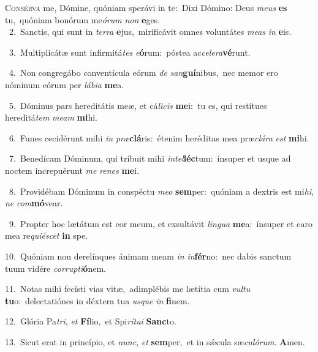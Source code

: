 \lettrine{\initial\textcolor{\initialcolor}{C}}{onsérva} me, Dómine, quóniam sperávi in te:~\dagger Dixi Dómino: Deus \textit{me}\-\textit{us} \textbf{es} tu,~\star quóniam bonórum me\-\textit{ó}\-\textit{rum} \textit{non} \textbf{e}\-ges.\\
{\numbfont\textcolor{\numbcolor}{~2.}}~Sanctis, qui sunt in \textit{ter}\-\textit{ra} \textbf{e}\-jus,~\star mirificávit omnes voluntátes \textit{me}\-\textit{as} \textit{in} \textbf{e}\-is.\par
{\numbfont\textcolor{\numbcolor}{~3.}}~Multiplicátæ sunt infirmitá\textit{tes} \textit{e}\-\textbf{ó}rum:~\star póstea ac\-\textit{ce}\-\textit{le}\textit{ra}\textbf{vé}runt.\par
{\numbfont\textcolor{\numbcolor}{~4.}}~Non congregábo conventícula eórum \textit{de} \textit{san}\-\textbf{guí}nibus,~\star nec memor ero nóminum eórum per \textit{lá}\-\textit{bi}\textit{a} \textbf{me}\-a.\par
{\numbfont\textcolor{\numbcolor}{~5.}}~Dóminus pars hereditátis meæ, et cá\-\textit{li}\-\textit{cis} \textbf{me}\-i:~\star tu es, qui restítues hereditá\textit{tem} \textit{me}\-\textit{am} \textbf{mi}\-hi.\par
{\numbfont\textcolor{\numbcolor}{~6.}}~Funes cecidérunt mihi \textit{in} \textit{præ}\-\textbf{clá}ris:~\star étenim heréditas mea præ\-\textit{clá}\-\textit{ra} \textit{est} \textbf{mi}\-hi.\par
{\numbfont\textcolor{\numbcolor}{~7.}}~Benedícam Dóminum, qui tríbuit mihi \textit{in}\-\textit{tel}\textbf{léc}tum:~\star ínsuper et usque ad noctem increpuérunt \textit{me} \textit{re}\-\textit{nes} \textbf{me}\-i.\par
{\numbfont\textcolor{\numbcolor}{~8.}}~Providébam Dóminum in conspéctu \textit{me}\-\textit{o} \textbf{sem}\-per:~\star quóniam a dextris est mi\-\textit{hi}\-, \textit{ne} \textit{com}\-\textbf{mó}vear.\par
{\numbfont\textcolor{\numbcolor}{~9.}}~Propter hoc lætátum est cor meum, et exsultávit \textit{lin}\-\textit{gua} \textbf{me}\-a:~\star ínsuper et caro mea re\-\textit{qui}\-\textit{é}\textit{scet} \textbf{in} spe.\par
{\numbfont\textcolor{\numbcolor}{10.}}~Quóniam non derelínques ánimam meam \textit{in} \textit{in}\-\textbf{fér}no:~\star nec dabis sanctum tuum vidére \textit{cor}\-\textit{rup}\textit{ti}\textbf{ó}nem.\par
{\numbfont\textcolor{\numbcolor}{11.}}~Notas mihi fecísti vias vitæ,~\dagger adimplébis me lætítia cum \textit{vul}\-\textit{tu} \textbf{tu}\-o:~\star delectatiónes in déxtera tua \textit{us}\-\textit{que} \textit{in} \textbf{fi}\-nem.\par
{\numbfont\textcolor{\numbcolor}{12.}}~Glória Pa\-\textit{tri}\-, \textit{et} \textbf{Fí}\-lio,~\star et Spi\-\textit{rí}\-\textit{tu}\textit{i} \textbf{Sanc}\-to.\par
{\numbfont\textcolor{\numbcolor}{13.}}~Sicut erat in princípio, et \textit{nunc}\-, \textit{et} \textbf{sem}\-per,~\star et in sǽcula sæ\-\textit{cu}\-\textit{ló}\textit{rum}. \textbf{A}\-men.\par
